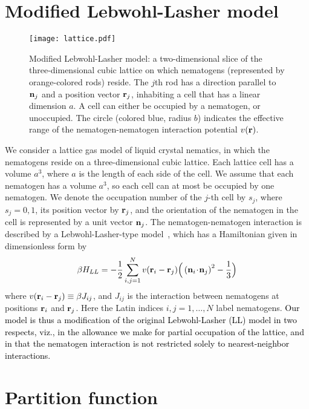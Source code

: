 \documentclass[jcp,aps,twocolumn,showpacs,supergroupedaddress,epsfig,amsmath,amssymb,eqsecnum]{revtex4}
\def\nv{{\bf n}}
\newcommand{\be}{\begin{equation}}
\newcommand{\ee}{\end{equation}}
\newcommand{\rv}{{\bf r}}
\newcommand{\bing}[1]{\textcolor{black}{#1}}
\begin{document}
\section{Modified Lebwohl-Lasher model}
\begin{figure}[h]
\centering
  \texttt{[image: lattice.pdf]}
  \caption{Modified Lebwohl-Lasher model: a two-dimensional slice of the three-dimensional cubic lattice on which nematogens (represented by orange-colored rods) reside. The $j$th rod has a direction parallel to $\nv_j$ and a position vector $\rv_j$, inhabiting a cell that has a linear dimension $a$. A cell can either be occupied by a nematogen, or unoccupied. The circle (colored blue, radius $b$) indicates the effective range of the nematogen-nematogen interaction potential $v(\rv)$.} 
  \label{fig:lattice}
\end{figure}
We consider a lattice gas model of liquid crystal nematics, in which the nematogens reside on a three-dimensional cubic lattice. Each lattice cell has a volume $a^3$, where $a$ is the length of each side of the cell. We assume that each nematogen has a volume $a^3$, so each cell can at most be occupied by one nematogen. We denote the occupation number of the $j$-th cell by $s_j$, where $s_j=0,1$, its position vector by $\rv_j$, and the orientation of the nematogen in the cell is represented by a unit vector $\nv_j$. The nematogen-nematogen interaction is described by a Lebwohl-Lasher-type model~\cite{lebwohl-lasher1972}, which has a Hamiltonian given in dimensionless form by
\be
\beta H_{LL} = -\frac{1}{2} \sum_{i,j=1}^{N} v(\rv_i-\rv_j) \Big( \left( {\bf n}_i \!\cdot\! {\bf n}_j \right)^2 - \frac{1}{3} \Big)
\ee
where $v(\rv_i - \rv_j) \equiv \beta J_{ij}$, and $J_{ij}$ is the interaction between nematogens at positions $\rv_i$ and $\rv_j$. 
Here the Latin indices $i, j = 1, \dots, N$ label nematogens. \bing{Our model is thus a modification of the original Lebwohl-Lasher (LL) model in two respects, viz., in the allowance we make for partial occupation of the lattice, and in that the nematogen interaction is not restricted solely to nearest-neighbor interactions. }

\section{Partition function}
\end{document}
